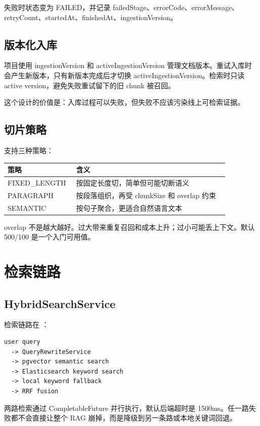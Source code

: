 \documentclass[UTF8,zihao=-4]{ctexart}
\begin{document}
失败时状态变为 FAILED，并记录 failedStage、errorCode、errorMessage、retryCount、startedAt、finishedAt、ingestionVersion。

\subsection{版本化入库}

项目使用 ingestionVersion 和 activeIngestionVersion 管理文档版本。重试入库时会产生新版本，只有新版本完成后才切换 activeIngestionVersion。检索时只读 active version，避免失败重试留下的旧 chunk 被召回。

这个设计的价值是：入库过程可以失败，但失败不应该污染线上可检索证据。

\subsection{切片策略}

 支持三种策略：

\begin{longtable}{L{0.22\linewidth}L{0.65\linewidth}}
\toprule
策略 & 含义 \\
\midrule
FIXED\_LENGTH & 按固定长度切，简单但可能切断语义 \\
PARAGRAPH & 按段落组织，再受 chunkSize 和 overlap 约束 \\
SEMANTIC & 按句子聚合，更适合自然语言文本 \\
\bottomrule
\end{longtable}

overlap 不是越大越好。过大带来重复召回和成本上升；过小可能丢上下文。默认 500/100 是一个入门可用值。

\section{检索链路}

\subsection{HybridSearchService}

检索链路在 ：

\begin{lstlisting}[style=code]
user query
  -> QueryRewriteService
  -> pgvector semantic search
  -> Elasticsearch keyword search
  -> local keyword fallback
  -> RRF fusion
\end{lstlisting}

两路检索通过 CompletableFuture 并行执行，默认后端超时是 1500ms。任一路失败都不会直接让整个 RAG 崩掉，而是降级到另一条路或本地关键词回退。
\end{document}
